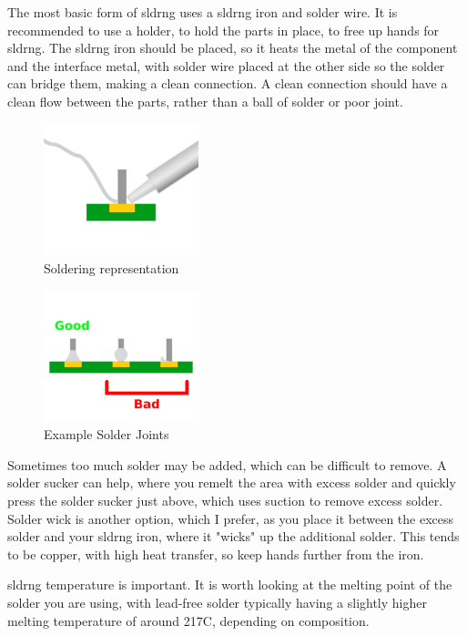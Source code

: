 \documentclass[a4paper,11pt]{report}
\begin{document}
The most basic form of \gls{sldrng} uses a \gls{sldrng} iron and solder wire. It is recommended to use a holder, to hold the parts in place, to free up hands for \gls{sldrng}. The \gls{sldrng} iron should be placed, so it heats the metal of the component and the interface metal, with solder wire placed at the other side so the solder can bridge them, making a clean connection. A clean connection should have a clean flow between the parts, rather than a ball of solder or poor joint.

\begin{figure}[H]
\centering
\includegraphics[width=0.4\textwidth]{soldering}
\caption{Soldering representation}
\end{figure}

\begin{figure}[H]
\centering
\includegraphics[width=0.4\textwidth]{solderjoints}
\caption{Example Solder Joints}
\end{figure}

Sometimes too much solder may be added, which can be difficult to remove. A solder sucker can help, where you remelt the area with excess solder and quickly press the solder sucker just above, which uses suction to remove excess solder. Solder wick is another option, which I prefer, as you place it between the excess solder and your \gls{sldrng} iron, where it "wicks" up the additional solder. This tends to be copper, with high heat transfer, so keep hands further from the iron.

\gls{sldrng} temperature is important. It is worth looking at the melting point of the solder you are using, with lead-free solder typically having a slightly higher melting temperature of around 217C, depending on composition.
\end{document}
